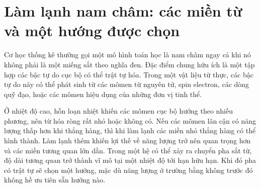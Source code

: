 \section{Làm lạnh nam châm: các miền từ và một hướng được chọn}

Cơ học thống kê thường gọi một mô hình toán học là nam châm ngay cả khi nó không phải là một miếng sắt theo nghĩa đen. Đặc điểm chung hữu ích là một tập hợp các bậc tự do cục bộ có thể trật tự hóa. Trong một vật liệu từ thực, các bậc tự do này có thể phát sinh từ các mômen từ nguyên tử, spin electron, các dòng quỹ đạo, hoặc các mômen hiệu dụng của những đơn vị tinh thể.

Ở nhiệt độ cao, hỗn loạn nhiệt khiến các mômen cục bộ hướng theo nhiều phương, nên từ hóa ròng rất nhỏ hoặc không có. Nếu các mômen lân cận có năng lượng thấp hơn khi thẳng hàng, thì khi làm lạnh các miền nhỏ thẳng hàng có thể hình thành. Làm lạnh thêm khiến lợi thế về năng lượng trở nên quan trọng hơn và các miền tương quan lớn dần. Trong một hệ có thể xảy ra chuyển pha sắt từ, độ dài tương quan trở thành vĩ mô tại một nhiệt độ tới hạn hữu hạn. Khi đó pha có trật tự sẽ chọn một hướng, mặc dù năng lượng ở trường bằng không trước đó không hề ưu tiên sẵn hướng nào.

\begin{classroomqa}
\end{classroomqa}

\begin{classroomqa}
\end{classroomqa}

